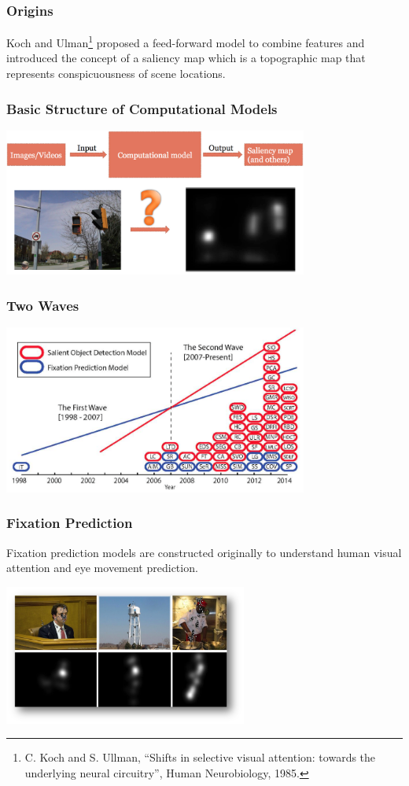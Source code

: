\documentclass[notheorems,serif,table,compress]{beamer}  %
\begin{document}
\begin{frame}
\frametitle{Origins}
Koch and Ulman\footnote{C. Koch and S. Ullman, ``Shifts in selective visual attention: towards the underlying neural circuitry'', Human Neurobiology, 1985.} proposed a feed-forward model to combine features and introduced the concept of a saliency map which is a topographic map that represents conspicuousness of scene locations.
\end{frame}


\begin{frame}
\frametitle{Basic Structure of Computational Models}
\centering\includegraphics[width=10cm]{BasicStructure.jpg}
\end{frame}


\begin{frame}
\frametitle{Two Waves}
\centering\includegraphics[width=10cm]{wave}
\end{frame}


\begin{frame}
\frametitle{Fixation Prediction}
Fixation prediction models are constructed originally to understand human visual attention and eye movement prediction.

\centering\includegraphics[width=8cm]{fixationPrediction.png}
\end{frame}
\end{document}

